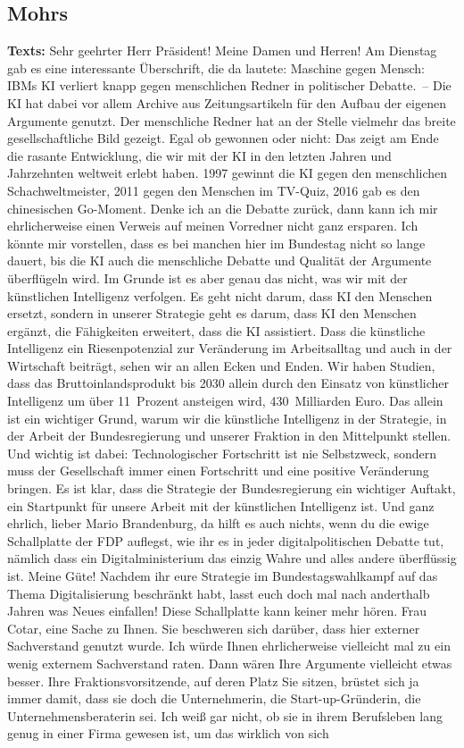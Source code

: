 \documentclass{article}
\begin{document}
\subsection{Mohrs}
\noindent\textbf{Texts:} Sehr geehrter Herr Präsident! Meine Damen und Herren! Am Dienstag gab es eine interessante Überschrift, die da lautete: Maschine gegen Mensch: IBMs KI verliert knapp gegen menschlichen Redner in politischer Debatte. – Die KI hat dabei vor allem Archive aus Zeitungsartikeln für den Aufbau der eigenen Argumente genutzt. Der menschliche Redner hat an der Stelle vielmehr das breite gesellschaftliche Bild gezeigt. Egal ob gewonnen oder nicht: Das zeigt am Ende die rasante Entwicklung, die wir mit der KI in den letzten Jahren und Jahrzehnten weltweit erlebt haben. 1997 gewinnt die KI gegen den menschlichen Schachweltmeister, 2011 gegen den Menschen im TV-Quiz, 2016 gab es den chinesischen Go-Moment. Denke ich an die Debatte zurück, dann kann ich mir ehrlicherweise einen Verweis auf meinen Vorredner nicht ganz ersparen. Ich könnte mir vorstellen, dass es bei manchen hier im Bundestag nicht so lange dauert, bis die KI auch die menschliche Debatte und Qualität der Argumente überflügeln wird.  Im Grunde ist es aber genau das nicht, was wir mit der künstlichen Intelligenz verfolgen. Es geht nicht darum, dass KI den Menschen ersetzt, sondern in unserer Strategie geht es darum, dass KI den Menschen ergänzt, die Fähigkeiten erweitert, dass die KI assistiert. Dass die künstliche Intelligenz ein Riesenpotenzial zur Veränderung im Arbeitsalltag und auch in der Wirtschaft beiträgt, sehen wir an allen Ecken und Enden. Wir haben Studien, dass das Bruttoinlandsprodukt bis 2030 allein durch den Einsatz von künstlicher Intelligenz um über 11 Prozent ansteigen wird, 430 Milliarden Euro. Das allein ist ein wichtiger Grund, warum wir die künstliche Intelligenz in der Strategie, in der Arbeit der Bundesregierung und unserer Fraktion in den Mittelpunkt stellen. Und wichtig ist dabei: Technologischer Fortschritt ist nie Selbstzweck, sondern muss der Gesellschaft immer einen Fortschritt und eine positive Veränderung bringen.  Es ist klar, dass die Strategie der Bundesregierung ein wichtiger Auftakt, ein Startpunkt für unsere Arbeit mit der künstlichen Intelligenz ist. Und ganz ehrlich, lieber Mario Brandenburg, da hilft es auch nichts, wenn du die ewige Schallplatte der FDP auflegst, wie ihr es in jeder digitalpolitischen Debatte tut, nämlich dass ein Digitalministerium das einzig Wahre und alles andere überflüssig ist. Meine Güte! Nachdem ihr eure Strategie im Bundestagswahlkampf auf das Thema Digitalisierung beschränkt habt, lasst euch doch mal nach anderthalb Jahren was Neues einfallen!  Diese Schallplatte kann keiner mehr hören. Frau Cotar, eine Sache zu Ihnen. Sie beschweren sich darüber, dass hier externer Sachverstand genutzt wurde. Ich würde Ihnen ehrlicherweise vielleicht mal zu ein wenig externem Sachverstand raten.  Dann wären Ihre Argumente vielleicht etwas besser. Ihre Fraktionsvorsitzende, auf deren Platz Sie sitzen, brüstet sich ja immer damit, dass sie doch die Unternehmerin, die Start-up-Gründerin, die Unternehmensberaterin sei. Ich weiß gar nicht, ob sie in ihrem Berufsleben lang genug in einer Firma gewesen ist, um das wirklich von sich 
\end{document}
